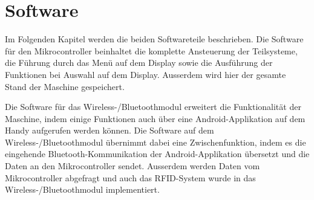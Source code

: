 \newpage
\section{Software}
\label{sec:Software}

Im Folgenden Kapitel werden die beiden Softwareteile beschrieben. Die Software für den Mikrocontroller beinhaltet die komplette Ansteuerung der Teilsysteme, die Führung durch das Menü auf dem Display sowie die Ausführung der Funktionen bei Auswahl auf dem Display. Ausserdem wird hier der gesamte Stand der Maschine gespeichert.

Die Software für das Wireless-/Bluetoothmodul erweitert die Funktionalität der Maschine, indem einige Funktionen auch über eine Android-Applikation auf dem Handy aufgerufen werden können. Die Software auf dem Wireless-/Bluetoothmodul übernimmt dabei eine Zwischenfunktion, indem es die eingehende Bluetooth-Kommunikation der Android-Applikation übersetzt und die Daten an den Mikrocontroller sendet. Ausserdem werden Daten vom Mikrocontroller abgefragt und auch das RFID-System wurde in das Wireless-/Bluetoothmodul implementiert.